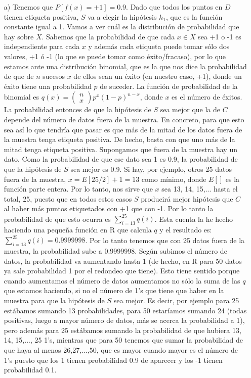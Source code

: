 \documentclass[12pt]{article}
\theoremstyle{definition}
\begin{document}
\begin{pregunta}
\begin{enumerate}
\item[a)] Tenemos que $P[f(x) = +1]=0.9$. Dado que todos los puntos en $D$ tienen etiqueta positiva, $S$ va a elegir la hipótesis $h_1$, que es la función constante igual a 1. Vamos a ver cuál es la distribución de probabilidad que hay sobre $X$. Sabemos que la probabilidad de que cada $x \in X$ sea +1 o -1 es independiente para cada $x$ y además cada etiqueta puede tomar sólo dos valores, +1 ó -1 (lo que se puede tomar como éxito/fracaso), por lo que estamos ante una distribución binomial, que es la que nos dice la probabilidad de que de $n$ sucesos $x$ de ellos sean un éxito (en nuestro caso, +1), donde un éxito tiene una probabilidad $p$ de suceder. La función de probabilidad de la binomial es $q(x) = \left( \begin{array}{c} n \\ x \end{array} \right) p^x(1-p)^{n-x}$, donde $x$ es el número de éxitos. La probabilidad entonces de que la hipótesis de $S$ sea mejor que la de $C$ depende del número de datos fuera de la muestra. En concreto, para que esto sea así lo que tendría que pasar es que más de la mitad de los datos fuera de la muestra tenga etiqueta positiva. De hecho, basta con que uno más de la mitad tenga etiqueta positiva. Supongamos que fuera de la muestra hay un dato. Como la probabilidad de que ese dato sea 1 es 0.9, la probabilidad de que la hipótesis de $S$ sea mejor es 0.9. Si hay, por ejemplo, otros 25 datos fuera de la muestra, $x=E[25/2] +1=13$ como mínimo, donde $E[]$ es la función parte entera. Por lo tanto, nos sirve que $x$ sea 13, 14, 15,... hasta el total, 25, puesto que en todos estos casos $S$ producirá mejor hipótesis que $C$ al haber más puntos etiquetados con +1 que con -1. Por lo tanto la probabilidad de que esto ocurra es $\sum_{i=13}^{25} q(i)$. Esta cuenta la he hecho haciendo una pequeña función en R que calcula $q$ y el resultado es: $\sum_{i=13}^{25} q(i) = 0.9999998$. Por lo tanto tenemos que con 25 datos fuera de la muestra, la probabilidad sube a 0.9999998. Según subimos el número de datos, la probabilidad va aumentando hasta 1 (de hecho, en R para 50 datos ya sale probabilidad 1 por el redondeo que tiene). Esto tiene sentido porque cuando aumentamos el número de datos aumentamos no sólo la suma de las $q$ que estamos haciendo, si no el número de 1's que tiene que haber en la muestra para que la hipótesis de $S$ sea mejor. Es decir, por ejemplo para 25 estábamos sumando 13 probabilidades, para 50 estaríamos sumando 24 (todas positivas, luego a mayor número de datos, más se acerca la probabilidad a 1), pero además para 25 estábamos sumando la probabilidad de que hubiera 13, 14, 15,..., 25 1's, mientras que para 50 tenemos que sumar la probabilidad de que haya al menos 26,27,...,50, que es mayor cuando mayor es el número de 1's puesto que los 1 tienen probabilidad 0.9 de aparecer y los -1 tienen probabilidad 0.1.\\


\end{enumerate}
\end{pregunta}
\end{document}
